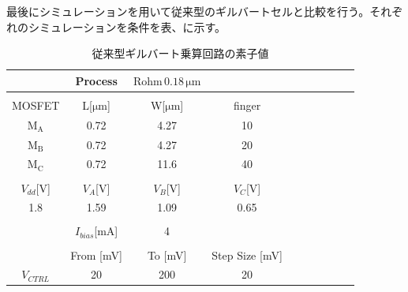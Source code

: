 \documentclass[twocolumn]{jsarticle}
\begin{document}
    最後にシミュレーションを用いて従来型のギルバートセルと比較を行う。それぞれのシミュレーションを条件を表、に示す。
    \begin{table}[H]
        \caption{従来型ギルバート乗算回路の素子値}
        \label{table:state_previous_ac}
        \centering
        \begin{tabular}{cccccccccc}
            \hline
            &Process&$\mathrm{Rohm\,0.18\,\mu m}$&\\
            \hline
            &&&\\
            MOSFET & L[$\mathrm{\mu m}$] & W[$\mathrm{\mu m}$] & finger\\
            \hline \hline
            $\mathrm{M_{A}}$ & 0.72 & 4.27 & 10 \\
            $\mathrm{M_{B}}$ & 0.72 & 4.27 & 20 \\
            $\mathrm{M_{C}}$ & 0.72 & 11.6 & 40 \\
            &&&\\
            $V_{dd}$[V] & $V_{A}$[V] & $V_{B}$[V] & $V_{C}$[V]\\
            \hline\hline
            1.8 & 1.59 & 1.09 & 0.65 \\
            &&&\\
            \hline\hline
            & $I_{bias}$[mA] & 4 & \\
            \hline\hline
            &&&\\
            & From [mV] & To [mV] &  Step Size [mV]   \\
            \hline\hline
            $V_{CTRL}$ & 20 & 200 & 20
        \end{tabular}
    \end{table}
\end{document}
